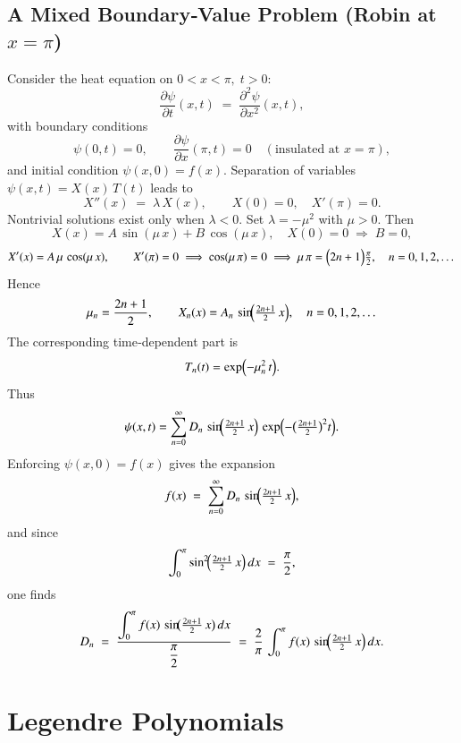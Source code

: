 \documentclass{report}
\begin{document}
\subsection{A Mixed Boundary‐Value Problem (Robin at \(x=\pi\))}

Consider the heat equation on \(0 < x < \pi,\; t>0\):
\[
\frac{\partial \psi}{\partial t}(x,t) 
\;=\; 
\frac{\partial^{2}\psi}{\partial x^{2}}(x,t),
\]
with boundary conditions 
\[
\psi(0,t)=0,
\qquad
\frac{\partial \psi}{\partial x}(\pi,t)=0
\quad(\text{insulated at }x=\pi),
\]
and initial condition \(\psi(x,0)=f(x)\).  Separation of variables \(\psi(x,t)=X(x)\,T(t)\) leads to
\[
X''(x) \;=\; \lambda\,X(x),
\qquad
X(0)=0,\quad X'(\pi)=0.
\]
Nontrivial solutions exist only when \(\lambda<0\).  Set \(\lambda=-\mu^{2}\) with \(\mu>0\).  Then
\[
X(x) = A\,\sin(\mu\,x) + B\,\cos(\mu\,x),
\quad
X(0)=0 \;\Longrightarrow\; B=0,
\]
\[
X'(x) = A\,\mu\,\cos(\mu\,x),
\qquad
X'(\pi)=0 \;\Longrightarrow\; \cos(\mu\,\pi)=0 
\;\Longrightarrow\; 
\mu\,\pi = \Bigl(2n+1\Bigr)\tfrac{\pi}{2}, 
\quad n=0,1,2,\dots
\]
Hence
\[
\mu_{n} = \frac{2n+1}{2}, 
\qquad
X_{n}(x) = A_{n}\,\sin\!\Bigl(\tfrac{2n+1}{2}\,x\Bigr),
\quad
n=0,1,2,\dots
\]
The corresponding time‐dependent part is 
\[
T_{n}(t) = \exp\Bigl(-\mu_{n}^{2}\,t\Bigr).
\]
Thus
\[
\psi(x,t)
= \sum_{n=0}^{\infty} D_{n}\,\sin\!\Bigl(\tfrac{2n+1}{2}\,x\Bigr)\,
\exp\Bigl(-\bigl(\tfrac{2n+1}{2}\bigr)^{2}t\Bigr).
\]
Enforcing \(\psi(x,0)=f(x)\) gives the expansion
\[
f(x) \;=\; \sum_{n=0}^{\infty} D_{n}\,\sin\!\Bigl(\tfrac{2n+1}{2}\,x\Bigr),
\]
and since
\[
\int_{0}^{\pi} \sin^{2}\!\Bigl(\tfrac{2n+1}{2}\,x\Bigr)\,dx \;=\; \frac{\pi}{2},
\]
one finds
\[
D_{n} \;=\; \frac{\displaystyle\int_{0}^{\pi} f(x)\,\sin\!\bigl(\tfrac{2n+1}{2}\,x\bigr)\,dx}
                {\displaystyle\frac{\pi}{2}}
\;=\; 
\frac{2}{\pi}\,\int_{0}^{\pi} f(x)\,\sin\!\Bigl(\tfrac{2n+1}{2}\,x\Bigr)\,dx.
\]

\section{Legendre Polynomials}
\end{document}
